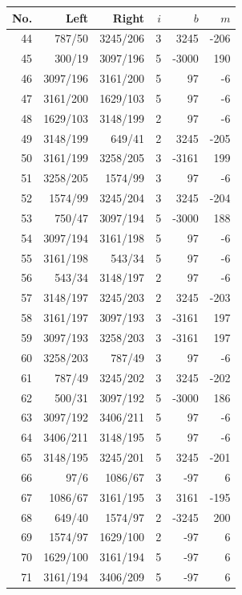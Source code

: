 \documentclass[11pt,a4paper]{article}
\begin{document}
\begin{minipage}[t]{.49\linewidth}\centering\footnotesize\setlength{\tabcolsep}{2pt}\renewcommand{\arraystretch}{1.09}
\begin{tabular*}{\linewidth}{@{}r@{\extracolsep{\fill}}rrrrr@{}}\toprule
No. & Left & Right & $i$ & $b$ & $m$\\\midrule
44 & 787/50 & 3245/206 & 3 & 3245 & -206\\
45 & 300/19 & 3097/196 & 5 & -3000 & 190\\
46 & 3097/196 & 3161/200 & 5 & 97 & -6\\
47 & 3161/200 & 1629/103 & 5 & 97 & -6\\
48 & 1629/103 & 3148/199 & 2 & 97 & -6\\
49 & 3148/199 & 649/41 & 2 & 3245 & -205\\
50 & 3161/199 & 3258/205 & 3 & -3161 & 199\\
51 & 3258/205 & 1574/99 & 3 & 97 & -6\\
52 & 1574/99 & 3245/204 & 3 & 3245 & -204\\
53 & 750/47 & 3097/194 & 5 & -3000 & 188\\
54 & 3097/194 & 3161/198 & 5 & 97 & -6\\
55 & 3161/198 & 543/34 & 5 & 97 & -6\\
56 & 543/34 & 3148/197 & 2 & 97 & -6\\
57 & 3148/197 & 3245/203 & 2 & 3245 & -203\\
58 & 3161/197 & 3097/193 & 3 & -3161 & 197\\
59 & 3097/193 & 3258/203 & 3 & -3161 & 197\\
60 & 3258/203 & 787/49 & 3 & 97 & -6\\
61 & 787/49 & 3245/202 & 3 & 3245 & -202\\
62 & 500/31 & 3097/192 & 5 & -3000 & 186\\
63 & 3097/192 & 3406/211 & 5 & 97 & -6\\
64 & 3406/211 & 3148/195 & 5 & 97 & -6\\
65 & 3148/195 & 3245/201 & 5 & 3245 & -201\\
66 & 97/6 & 1086/67 & 3 & -97 & 6\\
67 & 1086/67 & 3161/195 & 3 & 3161 & -195\\
68 & 649/40 & 1574/97 & 2 & -3245 & 200\\
69 & 1574/97 & 1629/100 & 2 & -97 & 6\\
70 & 1629/100 & 3161/194 & 5 & -97 & 6\\
71 & 3161/194 & 3406/209 & 5 & -97 & 6\\

\end{tabular*}
\end{minipage}
\end{document}
